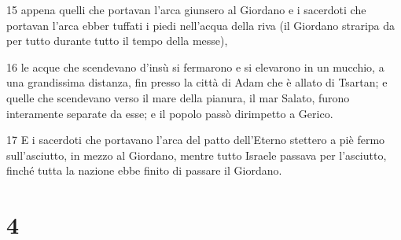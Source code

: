 \par 15 appena quelli che portavan l'arca giunsero al Giordano e i sacerdoti che portavan l'arca ebber tuffati i piedi nell'acqua della riva (il Giordano straripa da per tutto durante tutto il tempo della messe),
\par 16 le acque che scendevano d'insù si fermarono e si elevarono in un mucchio, a una grandissima distanza, fin presso la città di Adam che è allato di Tsartan; e quelle che scendevano verso il mare della pianura, il mar Salato, furono interamente separate da esse; e il popolo passò dirimpetto a Gerico.
\par 17 E i sacerdoti che portavano l'arca del patto dell'Eterno stettero a piè fermo sull'asciutto, in mezzo al Giordano, mentre tutto Israele passava per l'asciutto, finché tutta la nazione ebbe finito di passare il Giordano.

\chapter{4}

